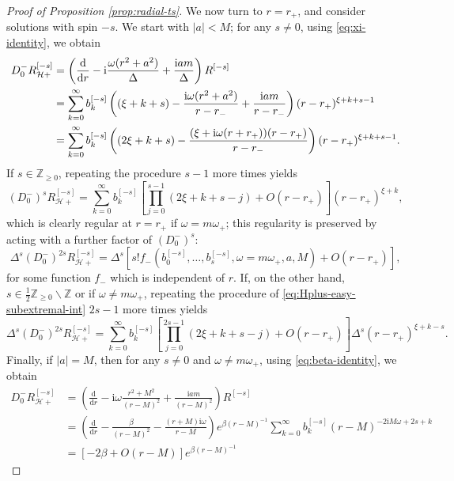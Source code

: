 \documentclass[11pt]{article}
\newcommand{\dd}{\mathrm{d}}
\newcommand{\ii}{\mathrm{i}}
\newcommand{\cH}{\mathcal H}
\numberwithin{equation}{section}
\begin{document}
\begin{proof}[Proof of Proposition \ref{prop:radial-ts}]
We now turn to $r=r_+$, and consider solutions with spin $-s$. We start with $|a|<M$; for any $s\neq 0$, using \eqref{eq:xi-identity}, we obtain
\begin{align}
D^-_0R^{[-s]}_{\cH+}
&=\left(\frac{\dd}{\dd r}-\ii\frac{\omega(r^2+a^2)}{\Delta}+\frac{\ii am}{\Delta}\right)R^{[-s]}\notag\\
&=\sum_{k=0}^{\infty}b^{[-s]}_k
\left((\xi+k+s)-\frac{\ii\omega(r^2+a^2)}{r-r_-}+\frac{\ii am}{r-r_-}\right)(r-r_+)^{\xi+k+s-1}\notag\\
&=\sum_{k=0}^{\infty}b^{[-s]}_k
\left((2\xi+k+s)-\frac{(\xi+\ii\omega(r+r_+))(r-r_+)}{r-r_-}\right)(r-r_+)^{\xi+k+s-1}. \label{eq:Hplus-easy-subextremal-int}
\end{align}
If $s\in\mathbb Z_{\geq 0}$, repeating the procedure $s-1$ more times yields 
\begin{equation*}
(D^-_0)^{s}R^{[-s]}_{\cH+}
=\sum_{k=0}^{\infty}b^{[-s]}_k
\left[\prod_{j=0}^{s-1}(2\xi+k+s-j)+O(r-r_+)\right]
(r-r_+)^{\xi+k},
\end{equation*}
which is clearly regular at $r=r_+$ if $\omega=m\omega_+$; this regularity is preserved by acting with a further factor of $(D^-_0)^{s}$: 
\begin{equation*}
\Delta^s(D^-_0)^{2s}R^{[-s]}_{\cH+}
=\Delta^s\left[s! f_-(b_0^{[-s]},\dots, b_s^{[-s]}, \omega=m\omega_+, a , M)+O(r-r_+)\right],\label{eq:Hplus-easy-subextremal1}
\end{equation*}
for some function $f_-$ which is independent of $r$. 
If, on the other hand, $s\in\frac12\mathbb Z_{\geq 0}\backslash\mathbb Z$ or if $\omega\neq m\omega_+$, repeating the procedure of \eqref{eq:Hplus-easy-subextremal-int} $2s-1$ more times yields
\begin{equation}\label{eq:Hplus-easy-subextremal2}
\Delta^s(D^-_0)^{2s}R^{[-s]}_{\cH+}
=\sum_{k=0}^{\infty}b^{[-s]}_k
\left[\prod_{j=0}^{2s-1}(2\xi+k+s-j)+O(r-r_+)\right]
\Delta^s(r-r_+)^{\xi+k-s}.
\end{equation}
Finally, if $|a|=M$, then for any $s\neq 0$ and $\omega\neq m\omega_+$, using \eqref{eq:beta-identity}, we obtain
\begin{align*}
D^-_0R^{[-s]}_{\cH+}
&=\left(\frac{\dd}{\dd r}-\ii\omega\frac{r^2+M^2}{(r-M)^2}+\frac{\ii am}{(r-M)^2}\right)R^{[-s]}\\
&=\left(\frac{\dd}{\dd r}-\frac{\beta}{(r-M)^2}-\frac{(r+M)\ii\omega}{r-M}\right)
   e^{\beta(r-M)^{-1}}\sum_{k=0}^{\infty}b^{[-s]}_k(r-M)^{-2\ii M\omega+2s+k}\\
&=\left[-2\beta+O(r-M)\right]e^{\beta(r-M)^{-1}}

\end{align*}
\end{proof}
\end{document}

